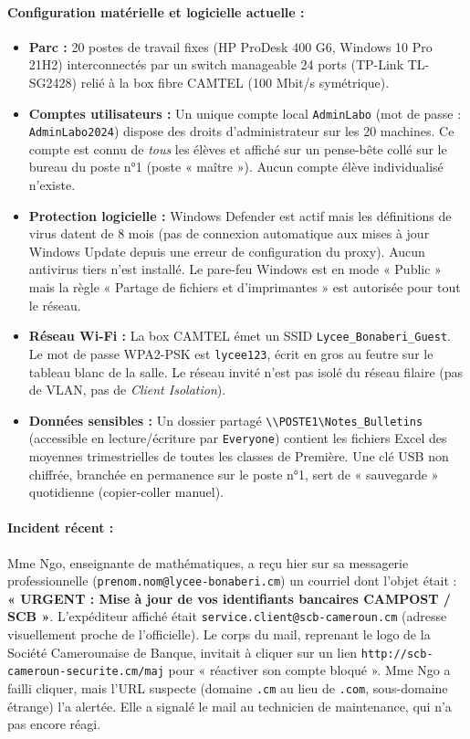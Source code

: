 \documentclass[11pt]{article}
\begin{document}
\paragraph{Configuration matérielle et logicielle actuelle :}
\begin{itemize}
    \item \textbf{Parc :} 20 postes de travail fixes (HP ProDesk 400 G6, Windows 10 Pro 21H2) interconnectés par un switch manageable 24 ports (TP-Link TL-SG2428) relié à la box fibre CAMTEL (100 Mbit/s symétrique).
    \item \textbf{Comptes utilisateurs :} Un unique compte local \texttt{AdminLabo} (mot de passe : \texttt{AdminLabo2024}) dispose des droits d'administrateur sur les 20 machines. Ce compte est connu de \emph{tous} les élèves et affiché sur un pense-bête collé sur le bureau du poste n°1 (poste « maître »). Aucun compte élève individualisé n'existe.
    \item \textbf{Protection logicielle :} Windows Defender est actif mais les définitions de virus datent de 8 mois (pas de connexion automatique aux mises à jour Windows Update depuis une erreur de configuration du proxy). Aucun antivirus tiers n'est installé. Le pare-feu Windows est en mode « Public » mais la règle « Partage de fichiers et d'imprimantes » est autorisée pour tout le réseau.
    \item \textbf{Réseau Wi-Fi :} La box CAMTEL émet un SSID \texttt{Lycee\_Bonaberi\_Guest}. Le mot de passe WPA2-PSK est \texttt{lycee123}, écrit en gros au feutre sur le tableau blanc de la salle. Le réseau invité n'est pas isolé du réseau filaire (pas de VLAN, pas de \emph{Client Isolation}).
    \item \textbf{Données sensibles :} Un dossier partagé \texttt{\textbackslash\textbackslash POSTE1\textbackslash Notes\_Bulletins} (accessible en lecture/écriture par \texttt{Everyone}) contient les fichiers Excel des moyennes trimestrielles de toutes les classes de Première. Une clé USB non chiffrée, branchée en permanence sur le poste n°1, sert de « sauvegarde » quotidienne (copier-coller manuel).
\end{itemize}

\paragraph{Incident récent :}
Mme Ngo, enseignante de mathématiques, a reçu hier sur sa messagerie professionnelle (\texttt{prenom.nom@lycee-bonaberi.cm}) un courriel dont l'objet était : \textbf{« URGENT : Mise à jour de vos identifiants bancaires CAMPOST / SCB »}. L'expéditeur affiché était \texttt{service.client@scb-cameroun.cm} (adresse visuellement proche de l'officielle). Le corps du mail, reprenant le logo de la Société Camerounaise de Banque, invitait à cliquer sur un lien \texttt{http://scb-cameroun-securite.cm/maj} pour « réactiver son compte bloqué ». Mme Ngo a failli cliquer, mais l'URL suspecte (domaine \texttt{.cm} au lieu de \texttt{.com}, sous-domaine étrange) l'a alertée. Elle a signalé le mail au technicien de maintenance, qui n'a pas encore réagi.
\end{document}
